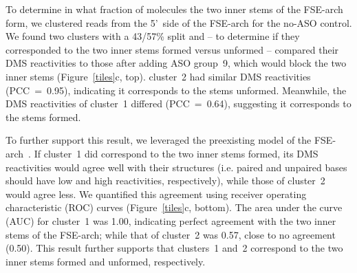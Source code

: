 \documentclass[main.tex]{subfiles}
\begin{document}
To determine in what fraction of molecules the two inner stems of the FSE-arch form, we clustered reads from the 5'~side of the FSE-arch for the no-ASO control.
We found two clusters with a 43/57\% split and -- to determine if they corresponded to the two inner stems formed versus unformed -- compared their DMS reactivities to those after adding ASO group~9, which would block the two inner stems (Figure~\ref{tiles}c, top).
cluster~2 had similar DMS reactivities (PCC~=~0.95), indicating it corresponds to the stems unformed.
Meanwhile, the DMS reactivities of cluster~1 differed (PCC~=~0.64), suggesting it corresponds to the stems formed.

To further support this result, we leveraged the preexisting model of the FSE-arch~\cite{Ziv2020}.
If cluster~1 did correspond to the two inner stems formed, its DMS reactivities would agree well with their structures (i.e. paired and unpaired bases should have low and high reactivities, respectively), while those of cluster~2 would agree less.
We quantified this agreement using receiver operating characteristic (ROC) curves (Figure~\ref{tiles}c, bottom).
The area under the curve (AUC) for cluster~1 was 1.00, indicating perfect agreement with the two inner stems of the FSE-arch; while that of cluster~2 was 0.57, close to no agreement (0.50).
This result further supports that clusters~1 and~2 correspond to the two inner stems formed and unformed, respectively.
\end{document}
